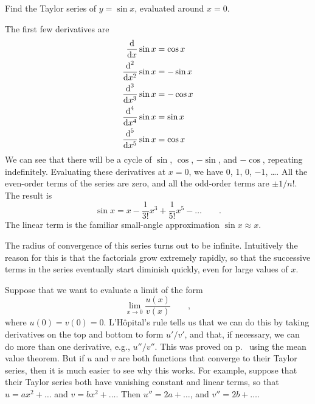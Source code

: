 \begin{eg}\label{eg:taylor-sin}
\egquestion Find the Taylor series of $y=\sin x$, evaluated around $x=0$.

\eganswer  The first few derivatives are
\begin{align*}
  \frac{\textup{d}}{\textup{d} x}\sin x &= \cos x \\
  \frac{\textup{d}^2}{\textup{d} x^2}\sin x &= -\sin x\\
  \frac{\textup{d}^3}{\textup{d} x^3}\sin x &= -\cos x\\
  \frac{\textup{d}^4}{\textup{d} x^4}\sin x &= \sin x\\
  \frac{\textup{d}^5}{\textup{d} x^5}\sin x &= \cos x
\end{align*}
We can see that there will be a cycle of $\sin$, $\cos$, $-\sin$, and $-\cos$, repeating
indefinitely. Evaluating these derivatives at $x=0$, we have
0, 1, 0, $-1$, \ldots. All the even-order terms of the series are zero, and all the odd-order
terms are $\pm1/n!$. The result is
\begin{equation*}
  \sin x = x - \frac{1}{3!}x^3 + \frac{1}{5!}x^5 - \ldots \qquad .
\end{equation*}
The linear term is the familiar small-angle approximation $\sin x\approx x$.

The radius of convergence of this series turns out to be infinite. Intuitively the reason for
this is that the factorials grow extremely rapidly, so that the successive terms in the series eventually start
diminish quickly, even for large values of $x$.
\end{eg}

\begin{eg}\label{eg:taylor-lhospital}
Suppose that we want to evaluate a limit of the form
\begin{equation*}
  \lim_{x\rightarrow 0} \frac{u(x)}{v(x)} \qquad ,
\end{equation*}
where $u(0)=v(0)=0$.
L'H\^{o}pital's rule tells us that we can do this by taking derivatives on the top and bottom
to form $u'/v'$, and that, if necessary, we can do more than one derivative, e.g., $u''/v''$.
This was proved on p.~\pageref{detour:lhospital-proofs} using the mean value theorem.
But if $u$ and $v$ are both functions that converge to their Taylor series, then it is
much easier to see why this works. For example, suppose that their Taylor series both have vanishing
constant and linear terms, so that $u=ax^2+\ldots$ and $v=bx^2+\ldots$. Then $u''=2a+\ldots$, 
and $v''=2b+\ldots$.
\end{eg}

